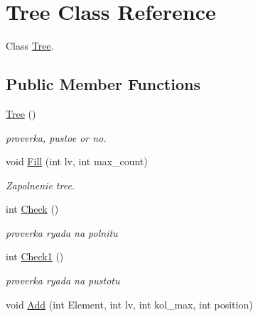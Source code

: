 \hypertarget{class_tree}{\section{Tree Class Reference}
\label{class_tree}
}


Class \hyperlink{class_tree}{Tree}.  


\subsection*{Public Member Functions}
\begin{DoxyCompactItemize}
\item 
\hypertarget{class_tree_ad376a7c639d857312f5de2ef47482f68}{\hyperlink{class_tree_ad376a7c639d857312f5de2ef47482f68}{Tree} ()}\label{class_tree_ad376a7c639d857312f5de2ef47482f68}

\begin{DoxyCompactList}\small\item\em proverka, pustoe or no. \end{DoxyCompactList}\item 
\hypertarget{class_tree_a121d3f98b89b95bd5d00a6fc2541bea1}{void \hyperlink{class_tree_a121d3f98b89b95bd5d00a6fc2541bea1}{Fill} (int lv, int max\-\_\-count)}\label{class_tree_a121d3f98b89b95bd5d00a6fc2541bea1}

\begin{DoxyCompactList}\small\item\em Zapolnenie tree. \end{DoxyCompactList}\item 
\hypertarget{class_tree_a134020dc526720cde9122ab2605d2f3c}{int \hyperlink{class_tree_a134020dc526720cde9122ab2605d2f3c}{Check} ()}\label{class_tree_a134020dc526720cde9122ab2605d2f3c}

\begin{DoxyCompactList}\small\item\em proverka ryada na polnitu \end{DoxyCompactList}\item 
\hypertarget{class_tree_a88141321de77854cd42de2f2b52ac34b}{int \hyperlink{class_tree_a88141321de77854cd42de2f2b52ac34b}{Check1} ()}\label{class_tree_a88141321de77854cd42de2f2b52ac34b}

\begin{DoxyCompactList}\small\item\em proverka ryada na pustotu \end{DoxyCompactList}\item 
\hypertarget{class_tree_abbace7ee9a1ed8d74fbe6675333f7201}{void \hyperlink{class_tree_abbace7ee9a1ed8d74fbe6675333f7201}{Add} (int Element, int lv, int kol\-\_\-max, int position)}\label{class_tree_abbace7ee9a1ed8d74fbe6675333f7201}


\end{DoxyCompactItemize}
